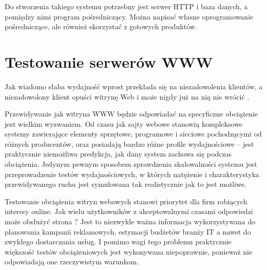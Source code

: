 Do stworzenia takiego systemu potrzebny jest serwer HTTP i baza danych, a pomiędzy nimi program pośredniczący. Można napisać 
własne oprogramowanie pośredniczące, ale również skorzystać z gotowych produktów.

\section{Testowanie serwerów WWW}


Jak wiadomo słaba wydajność wprost przekłada się 
na niezadowolenia klientów, a niezadowolony klient opuści witrynę Web i
może nigdy już na nią nie wrócić \cite{savoia1,savoia2,savoia3}.

Przewidywanie jak witryna WWW będzie odpowiadać na specyficzne obciążenie
jest wielkim wyzwaniem. Od czasu jak sajty webowe stanowią kompleksowe
systemy zawierające elementy sprzętowe, programowe i sieciowe pochodzącymi od
różnych producentów, oraz posiadają bardzo różne profile wydajnościowe -- 
jest praktycznie niemożliwa predykcja, jak dany system zachowa się podczas
obciążenia. Jedynym pewnym sposobem sprawdzenia skalowalności systemu
jest przeprowadzenie testów wydajnościowych, w których natężenie i 
charakterystyka przewidywanego ruchu jest symulowana tak realistycznie jak
to jest możliwe. 

Testowanie obciążenia witryn webowych stanowi priorytet dla firm robiących interesy online. Jak wielu użytkowników z 
akceptowalnymi czasami odpowiedzi może obsłużyć strona ? Jest to niezwykle ważna informacja wykorzystywana do planowania 
kampanii reklamowych, estymacji budżetów branży IT a nawet do zwykłego dostarczania usług. I pomimo wagi tego problemu 
praktycznie większość testów obciążeniowych jest wykonywana niepoprawnie, ponieważ nie odpowiadają one rzeczywistym warunkom. 

